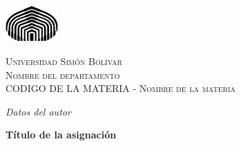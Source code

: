 \documentclass[12pt]{report}
\begin{document}
\thispagestyle{empty}

\begin{center}
    \includegraphics[width=0.15\textwidth]{images/logo}\par
	{\scshape Universidad Simón Bolívar \\
    Nombre del departamento \\
    CODIGO DE LA MATERIA - Nombre de la materia \par}
	{\itshape Datos del autor\par}
    {\large\bfseries Título de la asignación\par}
\end{center}
\end{document}
